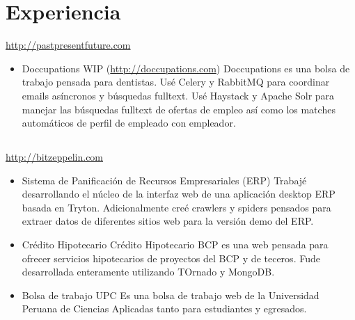\documentclass[11pt,a4paper,english]{moderncv}
\begin{document}
\maketitle

\section{Experiencia}
{
\url{http://pastpresentfuture.com}
\newline{}
\begin{itemize}
    \item Doccupations
        \newline
        WIP (\url{http://doccupations.com})
        \newline
        Doccupations es una bolsa de trabajo pensada para dentistas. Usé Celery y RabbitMQ para coordinar emails asíncronos y búsquedas fulltext. Usé Haystack y Apache Solr para manejar las búsquedas fulltext de ofertas de empleo así como los matches automáticos de perfil de empleado con empleador.
\end{itemize}
}

\subsection{}

{
\url{http://bitzeppelin.com}
\newline{}
\begin{itemize}
    \item Sistema de Panificación de Recursos Empresariales (ERP)
        \newline{}
        Trabajé desarrollando el núcleo de la interfaz web de una aplicación desktop ERP basada en Tryton. Adicionalmente creé crawlers y spiders pensados para extraer datos de diferentes sitios web para la versión demo del ERP.
    \item Crédito Hipotecario
        \newline{}
        Crédito Hipotecario BCP es una web pensada para ofrecer servicios hipotecarios de proyectos del BCP y de teceros. Fude desarrollada enteramente utilizando TOrnado y MongoDB.
    \item Bolsa de trabajo UPC
        \newline{}
        Es una bolsa de trabajo web de la Universidad Peruana de Ciencias Aplicadas tanto para estudiantes y egresados.
\end{itemize}
}
\end{document}
